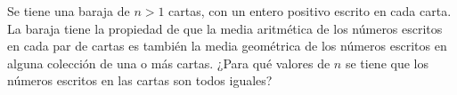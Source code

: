 Se tiene una baraja de $n \gt 1$ cartas, con un entero positivo escrito en cada carta. La baraja tiene la propiedad de que la media aritmética de los números escritos en cada par de cartas es también la media geométrica de los números escritos en alguna colección de una o más cartas.
¿Para qué valores de $n$ se tiene que los números escritos en las cartas son todos iguales?

